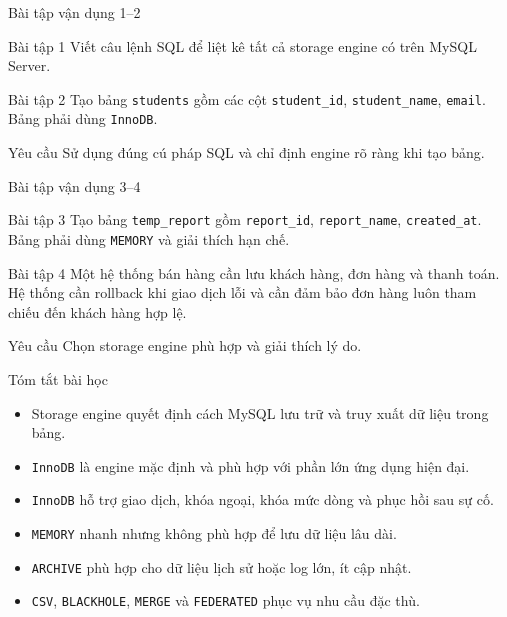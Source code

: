 \documentclass[aspectratio=169,11pt]{beamer}
\newcommand{\code}[1]{\texttt{#1}}
\newcommand{\smallitem}{\setlength{\itemsep}{2pt}}
\begin{document}
\begin{frame}{Bài tập vận dụng 1--2}
\begin{block}{Bài tập 1}
Viết câu lệnh SQL để liệt kê tất cả storage engine có trên MySQL Server.
\end{block}
\begin{block}{Bài tập 2}
Tạo bảng \code{students} gồm các cột \code{student\_id}, \code{student\_name}, \code{email}. Bảng phải dùng \code{InnoDB}.
\end{block}
\begin{alertblock}{Yêu cầu}
Sử dụng đúng cú pháp SQL và chỉ định engine rõ ràng khi tạo bảng.
\end{alertblock}
\end{frame}

\begin{frame}{Bài tập vận dụng 3--4}
\begin{block}{Bài tập 3}
Tạo bảng \code{temp\_report} gồm \code{report\_id}, \code{report\_name}, \code{created\_at}. Bảng phải dùng \code{MEMORY} và giải thích hạn chế.
\end{block}
\begin{block}{Bài tập 4}
Một hệ thống bán hàng cần lưu khách hàng, đơn hàng và thanh toán. Hệ thống cần rollback khi giao dịch lỗi và cần đảm bảo đơn hàng luôn tham chiếu đến khách hàng hợp lệ.
\end{block}
\begin{alertblock}{Yêu cầu}
Chọn storage engine phù hợp và giải thích lý do.
\end{alertblock}
\end{frame}

\begin{frame}{Tóm tắt bài học}
\begin{itemize}\smallitem
  \item Storage engine quyết định cách MySQL lưu trữ và truy xuất dữ liệu trong bảng.
  \item \code{InnoDB} là engine mặc định và phù hợp với phần lớn ứng dụng hiện đại.
  \item \code{InnoDB} hỗ trợ giao dịch, khóa ngoại, khóa mức dòng và phục hồi sau sự cố.
  \item \code{MEMORY} nhanh nhưng không phù hợp để lưu dữ liệu lâu dài.
  \item \code{ARCHIVE} phù hợp cho dữ liệu lịch sử hoặc log lớn, ít cập nhật.
  \item \code{CSV}, \code{BLACKHOLE}, \code{MERGE} và \code{FEDERATED} phục vụ nhu cầu đặc thù.
\end{itemize}
\end{frame}
\end{document}
